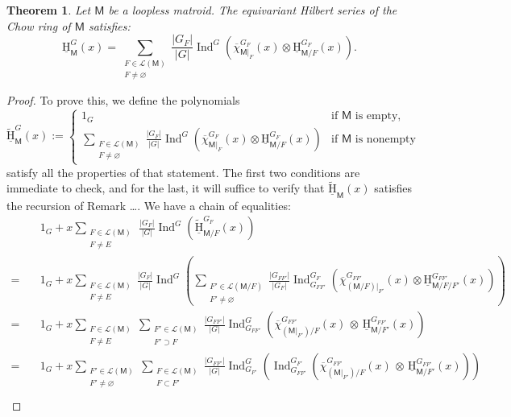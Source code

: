 \documentclass[11pt, a4paper, english]{amsart}
\theoremstyle{teoremas}
\newtheorem{theorem}{Theorem}[section]
\theoremstyle{definition}
\newcommand{\M}{\mathsf{M}}
\newcommand{\uH}{\underline{\mathrm{H}}}
\newcommand{\Ind}{\operatorname{Ind}}
\begin{document}
\begin{theorem}\label{thm:equiv-main-part2}
    Let $\M$ be a loopless matroid. The equivariant Hilbert series of the Chow ring of $\M$ satisfies:
    \[\uH_{\M}^G(x) = \sum_{\substack{F\in\mathcal{L}(\M)\\ F\neq\varnothing}} \frac{|G_F|}{|G|}\Ind^G\left(\overline{\chi}_{\M|_F}^{G_F}(x)\otimes \uH_{\M/F}^{G_F}(x)\right).\]
\end{theorem}
\begin{proof}
    To prove this, we define the polynomials
    \[ \widetilde{\uH}_{\M}^G(x) := 
    \begin{cases} 1_G & \text{if $\M$ is empty,}\\ \displaystyle\sum_{\substack{F\in\mathcal{L}(\M)\\ F\neq\varnothing}} \frac{|G_F|}{|G|}\Ind^G\left(\overline{\chi}_{\M|_F}^{G_F}(x)\otimes \uH_{\M/F}^{G_F}(x)\right) & \text{if $\M$ is nonempty}
    \end{cases}\]
    satisfy all the properties of that statement. The first two conditions are immediate to check, and for the last, it will suffice to verify that $\widetilde{\uH}_{\M}(x)$ satisfies the recursion of Remark \dots. We have a chain of equalities:
    \begin{align}
        &1_G + x\sum_{\substack{F\in\mathcal{L}(\M)\\ F\neq E}}\,\frac{|G_{F}|}{|G|}\Ind^G\left(\widetilde{\uH}_{\M/F}^{G_F}(x)\right)\nonumber\\ 
        =\quad &1_G + x\sum_{\substack{F\in \mathcal{L}(\M)\\F\neq E}}\frac{|G_{F}|}{|G|}\Ind^G\left(\sum_{\substack{F'\in \mathcal{L}(\M/F)\\F'\neq \varnothing}}\frac{|G_{FF'}|}{|G_F|}\Ind_{G_{FF'}}^{G_F}\left(\overline{\chi}_{(\M/F)|_{F'}}^{G_{FF'}}(x)\otimes \uH_{\M/F/F'}^{G_{FF'}}(x)\right)\right) \nonumber\\
        =\quad &1_G + x\sum_{\substack{F\in \mathcal{L}(\M)\\F\neq E}} \sum_{\substack{F'\in \mathcal{L}(\M)\\F'\supset F}} \frac{|G_{FF'}|}{|G|}\Ind_{G_{FF'}}^G\left(\overline{\chi}_{(\M|_{F'})/F}^{G_{FF'}}(x)\,\otimes\, \uH_{\M/F'}^{G_{FF'}}(x)\right)\nonumber\\
        =\quad &1_G + x\sum_{\substack{F'\in \mathcal{L}(\M)\\F'\neq \varnothing}} \sum_{\substack{F\in \mathcal{L}(\M)\\F\subset F'}} \frac{|G_{FF'}|}{|G|}\Ind_{G_{F'}}^G\left(\Ind_{G_{FF'}}^{G_{F'}}\left(\overline{\chi}_{(\M|_{F'})/F}^{G_{FF'}}(x)\,\otimes\, \uH_{\M/F'}^{G_{FF'}}(x)\right)\right)\nonumber\\

\end{align}
\end{proof}
\end{document}
